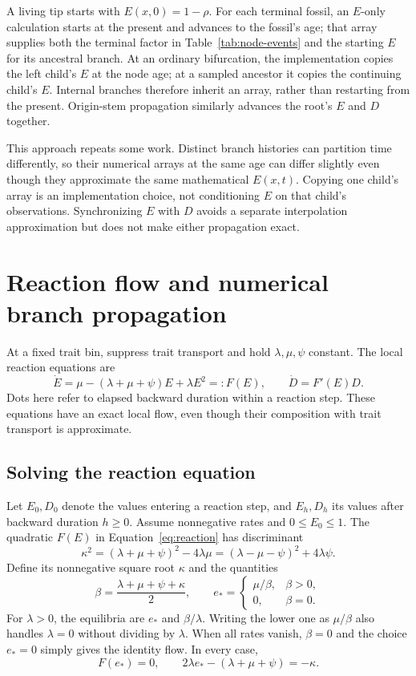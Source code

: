 \documentclass[11pt]{article}
\begin{document}
A living tip starts with $E(x,0)=1-\rho$. For each terminal fossil, an $E$-only calculation
starts at the present and advances to the fossil's age; that array supplies both the terminal
factor in Table~\ref{tab:node-events} and the starting $E$ for its ancestral branch.
At an ordinary bifurcation, the implementation copies the left child's $E$ at the node age;
at a sampled ancestor it copies the continuing child's $E$. Internal branches therefore
inherit an array, rather than restarting from the present. Origin-stem propagation similarly
advances the root's $E$ and $D$ together.

This approach repeats some work. Distinct branch histories can partition time differently,
so their numerical arrays at the same age can differ slightly even though they approximate
the same mathematical $E(x,t)$. Copying one child's array is an implementation choice, not
conditioning $E$ on that child's observations. Synchronizing $E$ with $D$ avoids a separate
interpolation approximation but does not make either propagation exact.

\section{Reaction flow and numerical branch propagation}\label{sec:reaction}
At a fixed trait bin, suppress trait transport and hold $\lambda,\mu,\psi$ constant. The local
reaction equations are
\begin{equation}\label{eq:reaction}
 \dot E=\mu-(\lambda+\mu+\psi)E+\lambda E^2=:F(E),
 \qquad \dot D=F'(E)D.
\end{equation}
Dots here refer to elapsed backward duration within a reaction step. These equations have an
exact local flow, even though their composition with trait transport is approximate.

\subsection{Solving the reaction equation}
Let $E_0,D_0$ denote the values entering a reaction step, and $E_h,D_h$ its values after
backward duration $h\geq0$. Assume nonnegative rates and $0\leq E_0\leq1$.
The quadratic $F(E)$ in Equation~\eqref{eq:reaction} has discriminant
\[
 \kappa^2=(\lambda+\mu+\psi)^2-4\lambda\mu
          =(\lambda-\mu-\psi)^2+4\lambda\psi.
\]
Define its nonnegative square root $\kappa$ and the quantities
\[
 \beta=\frac{\lambda+\mu+\psi+\kappa}{2},\qquad
 e_*=\begin{cases}\mu/\beta,&\beta>0,\\0,&\beta=0.\end{cases}
\]
For $\lambda>0$, the equilibria are $e_*$ and $\beta/\lambda$. Writing the lower one as
$\mu/\beta$ also handles $\lambda=0$ without dividing by $\lambda$.
When all rates vanish, $\beta=0$ and the choice $e_*=0$ simply gives the identity flow.
In every case,
\[
 F(e_*)=0,\qquad 2\lambda e_*-(\lambda+\mu+\psi)=-\kappa.
\]
\end{document}
